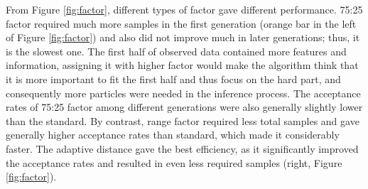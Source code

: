 From Figure \ref{fig:factor}, different types of factor gave different performance. 75:25 factor required much more samples in the first generation (orange bar in the left of Figure \ref{fig:factor}) and also did not improve much in later generations; thus, it is the slowest one. The first half of observed data contained more features and information, assigning it with higher factor would make the algorithm think that it is more important to fit the first half and thus focus on the hard part, and consequently more particles were needed in the inference process. The acceptance rates of 75:25 factor among different generations were also generally slightly lower than the standard. By contrast, range factor required less total samples and gave generally higher acceptance rates than standard, which made it considerably faster. The adaptive distance gave the best efficiency, as it significantly improved the acceptance rates and resulted in even less required samples (right, Figure \ref{fig:factor}).

